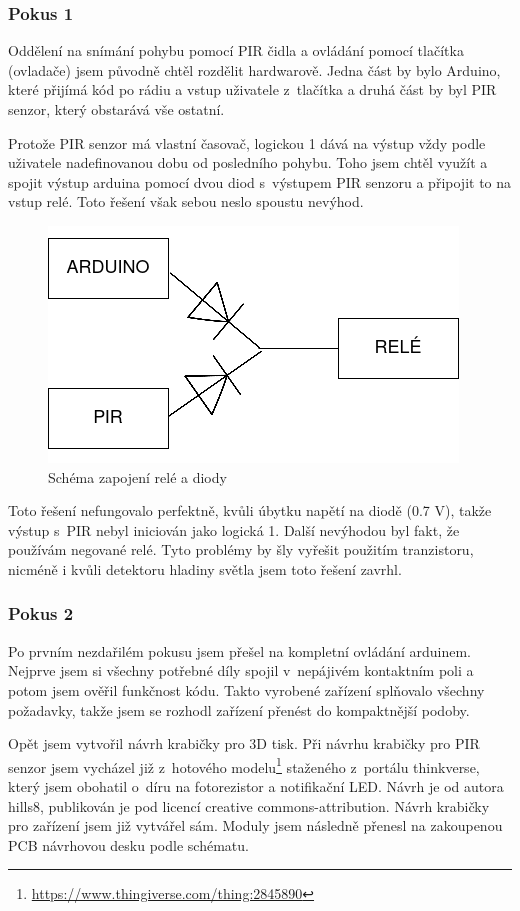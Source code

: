 \documentclass[11pt,a4paper,twoside,openright]{report}
\begin{document}
	\subsubsection{Pokus 1}
	
	Oddělení na snímání pohybu pomocí PIR čidla a ovládání pomocí tlačítka (ovladače) jsem původně chtěl rozdělit hardwarově. Jedna část by bylo Arduino, které přijímá kód po rádiu a vstup uživatele z~tlačítka a druhá část by byl PIR senzor, který obstarává vše ostatní.
	
	
	Protože PIR senzor má vlastní časovač, logickou 1 dává na výstup vždy podle uživatele nadefinovanou dobu od posledního pohybu. Toho jsem chtěl využít a spojit výstup arduina pomocí dvou diod s~výstupem PIR senzoru a připojit to na vstup relé. Toto řešení však sebou neslo spoustu nevýhod. 
	
	\begin{figure}[htb]
		\centering
		\includegraphics[width=0.5\hsize]{img/zapojeni_rele.png}
		\caption{Schéma zapojení relé a diody}\end{figure}
	
	Toto řešení nefungovalo perfektně, kvůli úbytku napětí na diodě (0.7 V), takže výstup s~PIR nebyl iniciován jako logická 1. Další nevýhodou byl fakt, že používám negované relé. Tyto problémy by šly vyřešit použitím tranzistoru, nicméně i kvůli detektoru hladiny světla jsem toto řešení zavrhl.
	
	\subsubsection{Pokus 2}
	
	Po prvním nezdařilém pokusu jsem přešel na kompletní ovládání arduinem. Nejprve jsem si všechny potřebné díly spojil v~nepájivém kontaktním poli a potom jsem ověřil funkčnost kódu. Takto vyrobené zařízení splňovalo všechny požadavky, takže jsem se rozhodl zařízení přenést do kompaktnější podoby.
	
	
	Opět jsem vytvořil návrh krabičky pro 3D tisk. Při návrhu krabičky pro PIR senzor jsem vycházel již z~hotového modelu\footnote{\url{https://www.thingiverse.com/thing:2845890}} staženého z~portálu thinkverse, který jsem obohatil o~díru na fotorezistor a notifikační LED. Návrh je od autora hills8, publikován je pod licencí creative commons-attribution. Návrh krabičky pro zařízení jsem již vytvářel sám. Moduly jsem následně přenesl na zakoupenou PCB návrhovou desku podle schématu.
	
\end{document}
